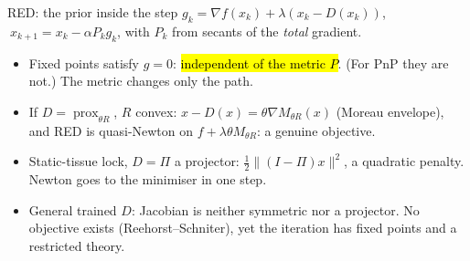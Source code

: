 \iflong
\begin{frame}{RED: the prior inside the step}
\footnotesize
$g_k=\nabla f(x_k)+\lambda(x_k-D(x_k))$, $\ x_{k+1}=x_k-\alpha P_kg_k$, with $P_k$ from secants of the \emph{total} gradient.
\begin{itemize}
\item Fixed points satisfy $g=0$: \hl{independent of the metric $P$}. (For PnP they are not.) The metric changes only the path.
\item If $D=\operatorname{prox}_{\theta R}$, $R$ convex: $x-D(x)=\theta\nabla M_{\theta R}(x)$ (Moreau envelope), and RED is quasi-Newton on $f+\lambda\theta M_{\theta R}$: a genuine objective.
\item Static-tissue lock, $D=\Pi$ a projector: $\tfrac12\|(I-\Pi)x\|^2$, a quadratic penalty. Newton goes to the minimiser in one step.
\item General trained $D$: Jacobian is neither symmetric nor a projector. No objective exists (Reehorst--Schniter), yet the iteration has fixed points and a restricted theory.
\end{itemize}
\end{frame}
\fi
